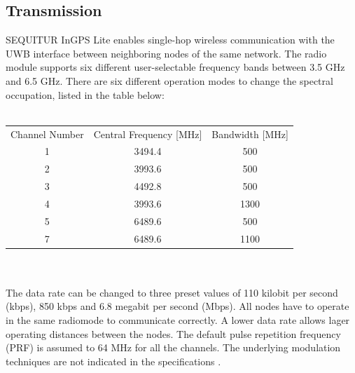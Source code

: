 \subsection{Transmission}
SEQUITUR InGPS Lite enables single-hop wireless communication with the UWB interface between neighboring nodes of the same network. 
The radio module supports six different user-selectable frequency bands between 3.5 GHz and 6.5 GHz. There are six different operation modes to change the spectral occupation, listed in the table below:\\
\\
\begin{tabular}{c c c}
Channel Number  & Central Frequency [MHz] & Bandwidth [MHz]\\
1 & 3494.4 & 500\\
2 & 3993.6 & 500\\
3 & 4492.8 & 500\\
4 & 3993.6 & 1300\\
5 & 6489.6 & 500\\
7 & 6489.6 & 1100\\
\end{tabular}
\\
\\
The data rate can be changed to three preset values of 110 kilobit per second (kbps), 850 kbps and 6.8 megabit per second (Mbps). All nodes have to operate in the same radiomode to communicate correctly. A lower data rate allows lager operating distances between the nodes. 
The default pulse repetition frequency (PRF) is assumed to 64 MHz for all the channels.
The underlying modulation techniques are not indicated in the specifications \cite{Usermanual} \cite{Beginnersguide}.

